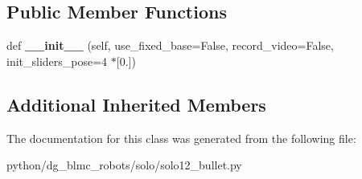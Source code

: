 \subsection*{Public Member Functions}
\begin{DoxyCompactItemize}
\item 
def {\bfseries \+\_\+\+\_\+init\+\_\+\+\_\+} (self, use\+\_\+fixed\+\_\+base=False, record\+\_\+video=False, init\+\_\+sliders\+\_\+pose=4 $\ast$\mbox{[}0.\mbox{]})\hypertarget{classdg__blmc__robots_1_1solo_1_1solo12__bullet_1_1Solo12BulletRobot_abff37cab7c1afded70506629b631af73}{}\label{classdg__blmc__robots_1_1solo_1_1solo12__bullet_1_1Solo12BulletRobot_abff37cab7c1afded70506629b631af73}

\end{DoxyCompactItemize}
\subsection*{Additional Inherited Members}


The documentation for this class was generated from the following file\+:\begin{DoxyCompactItemize}
\item 
python/dg\+\_\+blmc\+\_\+robots/solo/solo12\+\_\+bullet.\+py\end{DoxyCompactItemize}
